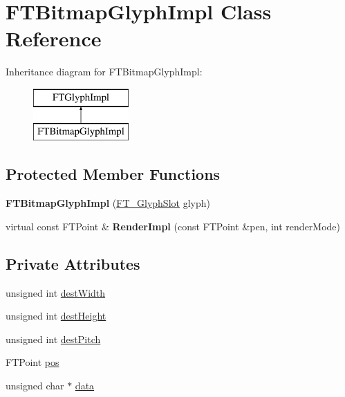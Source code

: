 \hypertarget{class_f_t_bitmap_glyph_impl}{}\section{F\+T\+Bitmap\+Glyph\+Impl Class Reference}
\label{class_f_t_bitmap_glyph_impl}
Inheritance diagram for F\+T\+Bitmap\+Glyph\+Impl\+:\begin{figure}[H]
\begin{center}
\leavevmode
\includegraphics[height=2.000000cm]{class_f_t_bitmap_glyph_impl}
\end{center}
\end{figure}
\subsection*{Protected Member Functions}
\begin{DoxyCompactItemize}
\item 
{\bfseries F\+T\+Bitmap\+Glyph\+Impl} (\hyperlink{struct_f_t___glyph_slot_rec__}{F\+T\+\_\+\+Glyph\+Slot} glyph)\hypertarget{class_f_t_bitmap_glyph_impl_a4462585cd1fc2e461ff8c6a0b49c68b3}{}\label{class_f_t_bitmap_glyph_impl_a4462585cd1fc2e461ff8c6a0b49c68b3}

\item 
virtual const F\+T\+Point \& {\bfseries Render\+Impl} (const F\+T\+Point \&pen, int render\+Mode)\hypertarget{class_f_t_bitmap_glyph_impl_a31a412b09a68489ab2e96ad4524badde}{}\label{class_f_t_bitmap_glyph_impl_a31a412b09a68489ab2e96ad4524badde}

\end{DoxyCompactItemize}
\subsection*{Private Attributes}
\begin{DoxyCompactItemize}
\item 
unsigned int \hyperlink{class_f_t_bitmap_glyph_impl_aee68c29c0749aa4dff423954c72eb3d1}{dest\+Width}
\item 
unsigned int \hyperlink{class_f_t_bitmap_glyph_impl_a77e1fbbf56804d28b6940150eeb82b69}{dest\+Height}
\item 
unsigned int \hyperlink{class_f_t_bitmap_glyph_impl_adf2486f483a57fa6c2b58d12f68df6d2}{dest\+Pitch}
\item 
F\+T\+Point \hyperlink{class_f_t_bitmap_glyph_impl_acdbd483a1ecd327916a7673ba959f747}{pos}
\item 
unsigned char $\ast$ \hyperlink{class_f_t_bitmap_glyph_impl_a5767f85fc8319899d2e180cda2a50c0c}{data}
\end{DoxyCompactItemize}
